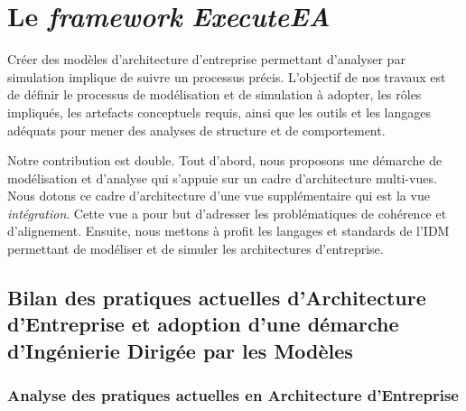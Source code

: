 \chapter{Le \emph{framework} \emph{ExecuteEA} }
\label{ch:proposition}

\PartialToc

Créer des modèles d'architecture d'entreprise permettant d'analyser par
simulation implique de suivre un processus précis. L'objectif de nos travaux
est de définir le processus de modélisation et de simulation à adopter, les
rôles impliqués, les artefacts conceptuels requis, ainsi que les outils et les
langages adéquats pour mener des analyses de structure et de comportement.

Notre contribution est double. Tout d'abord, nous proposons une démarche de
modélisation et d'analyse qui s'appuie sur un cadre d'architecture multi-vues.
Nous dotons ce cadre d'architecture d'une vue supplémentaire qui est la vue
\textit{intégration}. Cette vue a pour but d'adresser les problématiques de
cohérence et d'alignement. Ensuite, nous mettons à profit les langages et
standards de l'IDM permettant de modéliser et de simuler les architectures
d'entreprise.




\section[Bilan des pratiques actuelles d'EA et adoption d'une démarche IDM]{Bilan des pratiques actuelles d'Architecture d'Entreprise et adoption d'une démarche d'Ingénierie Dirigée par les Modèles}

\subsection{Analyse des pratiques actuelles en Architecture d'Entreprise}

